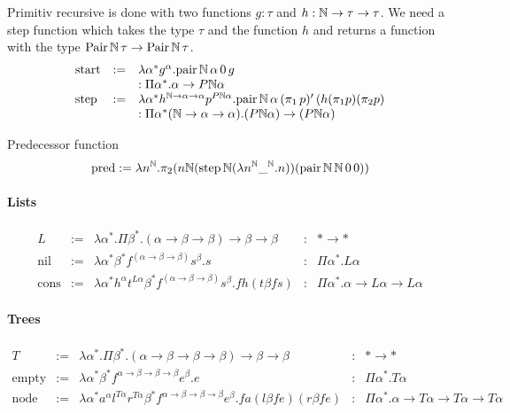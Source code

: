 Primitiv recursive is done with two functions $g:\tau$ and
$h:\mathbb{N} \to \tau \to \tau$. We need a step function which takes the type
$\tau$ and the function $h$ and returns a function with the type
$\text{Pair}\,\mathbb{N}\,\tau \to \text{Pair}\,\mathbb{N}\,\tau$.
$$
\begin{array}{lll}
  \text{start}
  &:=& \lambda
       \alpha^*
       g^\alpha
       . \text{pair}\,\mathbb{N}\,\alpha\,0\,g
  \\
  & &: \Pi \alpha^*. \alpha \to P\mathbb{N}\alpha
  \\
  \text{step}
  &:=& \lambda
       \alpha^*
       h^{\mathbb{N}\to\alpha\to\alpha}
       p^{P\mathbb{N}\alpha}
       . \text{pair}\,\mathbb{N}\,\alpha\,
       (\pi_1\,p)'\,
       (h (\pi_1 p) (\pi_2 p)
  \\
  & &: \Pi \alpha^* (\mathbb{N}\to\alpha\to\alpha)
      . (P\mathbb{N}\alpha)\to (P\mathbb{N}\alpha)
\end{array}
$$


Predecessor function
$$
\text{pred} :=
\lambda n^{\mathbb{N}}.
\pi_2 (
  n
  \mathbb{N} (\text{step}\,\mathbb{N} (\lambda n^{\mathbb{N}} \_^{\mathbb{N}}. n))
  (\text{pair}\,\mathbb{N}\,\mathbb{N}\,0\,0)
)
$$



\paragraph{Lists}

$$
\begin{array}{lllll}
  L
  &:=& \lambda \alpha^* .
       \Pi \beta^* . (\alpha\to\beta\to\beta) \to \beta \to \beta
  &:& * \to *
  \\
  \text{nil}
  &:=& \lambda \alpha^* \beta^* f^{(\alpha\to\beta\to\beta)} s^\beta . s
  &:& \Pi \alpha^* . L \alpha
  \\
  \text{cons}
  &:=& \lambda
       \alpha^*
       h^\alpha
       t^{L\alpha}
       \beta^*
       f^{(\alpha\to\beta\to\beta)}
       s^\beta
       . f h (t \beta f s)
  &:& \Pi \alpha^* . \alpha \to L \alpha \to L \alpha
\end{array}
$$




\paragraph{Trees}

$$
\begin{array}{lllll}
  T
  &:=& \lambda \alpha^* .
       \Pi \beta^* . (\alpha\to\beta\to\beta\to\beta) \to \beta \to \beta
  &:& * \to *
  \\
  \text{empty}
  &:=& \lambda \alpha^* \beta^* f^{\alpha\to\beta\to\beta\to\beta} e^\beta . e
  &:& \Pi \alpha^* . T \alpha
  \\
  \text{node}
  &:=& \lambda
       \alpha^*
       a^\alpha
       l^{T\alpha}
       r^{T\alpha}
       \beta^*
       f^{\alpha\to\beta\to\beta\to\beta}
       e^\beta
       . f a (l \beta f e) (r \beta f e)
  &:& \Pi \alpha^* . \alpha \to T \alpha \to T \alpha \to T \alpha
\end{array}
$$
